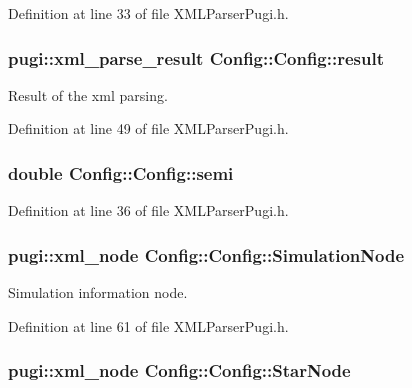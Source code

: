 Definition at line 33 of file XMLParserPugi.h.

\hypertarget{classConfig_1_1Config_adc7aa2f037d2b6c7f377b2ac2ec0e1b1}{
\subsubsection[{result}]{\setlength{\rightskip}{0pt plus 5cm}pugi::xml\_\-parse\_\-result {\bf Config::Config::result}}}
\label{classConfig_1_1Config_adc7aa2f037d2b6c7f377b2ac2ec0e1b1}


Result of the xml parsing. 



Definition at line 49 of file XMLParserPugi.h.

\hypertarget{classConfig_1_1Config_ac226b3dfdaf293240a6bfceb3b195d88}{
\subsubsection[{semi}]{\setlength{\rightskip}{0pt plus 5cm}double {\bf Config::Config::semi}}}
\label{classConfig_1_1Config_ac226b3dfdaf293240a6bfceb3b195d88}


Definition at line 36 of file XMLParserPugi.h.

\hypertarget{classConfig_1_1Config_a116dd11fe52f850709971ba73b8f7560}{
\subsubsection[{SimulationNode}]{\setlength{\rightskip}{0pt plus 5cm}pugi::xml\_\-node {\bf Config::Config::SimulationNode}}}
\label{classConfig_1_1Config_a116dd11fe52f850709971ba73b8f7560}


Simulation information node. 



Definition at line 61 of file XMLParserPugi.h.

\hypertarget{classConfig_1_1Config_ae031c18b0ec9ff285a88341b2a9da6d3}{
\subsubsection[{StarNode}]{\setlength{\rightskip}{0pt plus 5cm}pugi::xml\_\-node {\bf Config::Config::StarNode}}}
\label{classConfig_1_1Config_ae031c18b0ec9ff285a88341b2a9da6d3}


